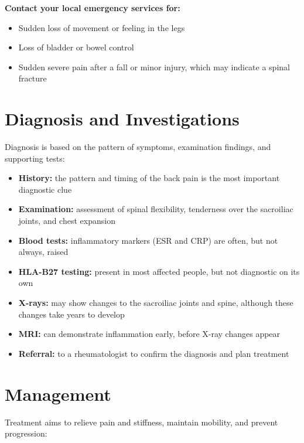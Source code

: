 \textbf{Contact your local emergency services for:}
\begin{itemize}
    \item Sudden loss of movement or feeling in the legs
    \item Loss of bladder or bowel control
    \item Sudden severe pain after a fall or minor injury, which may indicate a spinal fracture
\end{itemize}

\section*{Diagnosis and Investigations}
Diagnosis is based on the pattern of symptoms, examination findings, and supporting tests:

\begin{itemize}
    \item \textbf{History:} the pattern and timing of the back pain is the most important diagnostic clue
    \item \textbf{Examination:} assessment of spinal flexibility, tenderness over the sacroiliac joints, and chest expansion
    \item \textbf{Blood tests:} inflammatory markers (ESR and CRP) are often, but not always, raised
    \item \textbf{HLA-B27 testing:} present in most affected people, but not diagnostic on its own
    \item \textbf{X-rays:} may show changes to the sacroiliac joints and spine, although these changes take years to develop
    \item \textbf{MRI:} can demonstrate inflammation early, before X-ray changes appear
    \item \textbf{Referral:} to a rheumatologist to confirm the diagnosis and plan treatment
\end{itemize}

\section*{Management}
Treatment aims to relieve pain and stiffness, maintain mobility, and prevent progression:


